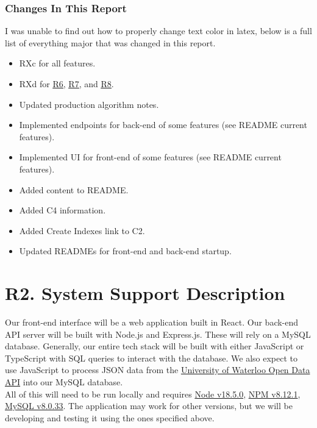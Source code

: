\documentclass[12pt, a4paper]{article}
\begin{document}
\subsubsection*{Changes In This Report}
I was unable to find out how to properly change text color in latex, below is a full list of everything major that was changed in this report.
\begin{itemize}
    \item RXc for all features.
    \item RXd for \underline{\hyperref[sec:R6]{R6}}, \underline{\hyperref[sec:R7]{R7}}, and \underline{\hyperref[sec:R8]{R8}}.
    \item Updated production algorithm notes.
    \item Implemented endpoints for back-end of some features (see README current features).
    \item Implemented UI for front-end of some features (see README current features).
    \item Added content to README.
    \item Added C4 information.
    \item Added Create Indexes link to C2.
    \item Updated READMEs for front-end and back-end startup.
\end{itemize}
\section*{R2. System Support Description}
\label{sec:R2}

Our front-end interface will be a web application built in React. Our back-end API server will be built with Node.js and Express.js. These will rely on a MySQL database. Generally, our entire tech stack will be built with either JavaScript or TypeScript with SQL queries to interact with the database. We also expect to use JavaScript to process JSON data from the \href{https://openapi.data.uwaterloo.ca/api-docs/index.html}{University of Waterloo Open Data API} into our MySQL database.\\

All of this will need to be run locally and requires \href{https://nodejs.org/en/download}{Node v18.5.0}, \href{https://nodejs.org/en/download}{NPM v8.12.1}, \href{https://dev.mysql.com/downloads/mysql/}{MySQL v8.0.33}. The application may work for other versions, but we will be developing and testing it using the ones specified above.\\
\end{document}
